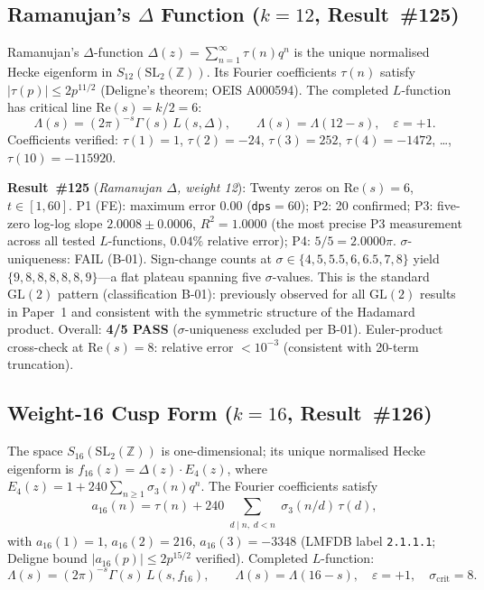 \documentclass[11pt, a4paper]{article}
\theoremstyle{plain}
\theoremstyle{definition}
\begin{document}
\subsection{Ramanujan's $\Delta$ Function ($k=12$, Result~\#125)}
\label{ssec:delta12}

Ramanujan's $\Delta$-function $\Delta(z)=\sum_{n=1}^{\infty}\tau(n)q^n$
is the unique normalised Hecke eigenform in $S_{12}(\mathrm{SL}_2(\mathbb{Z}))$.
Its Fourier coefficients $\tau(n)$ satisfy $|\tau(p)|\leq 2p^{11/2}$
(Deligne's theorem; OEIS A000594).  The completed $L$-function has critical
line $\mathrm{Re}(s)=k/2=6$:
\[
  \Lambda(s) = (2\pi)^{-s}\Gamma(s)\,L(s,\Delta), \qquad
  \Lambda(s)=\Lambda(12-s), \quad \varepsilon=+1.
\]
Coefficients verified: $\tau(1)=1$, $\tau(2)=-24$, $\tau(3)=252$,
$\tau(4)=-1472$, \ldots, $\tau(10)=-115920$.

\medskip
\noindent\textbf{Result~\#125} (\textit{Ramanujan $\Delta$, weight 12}):
Twenty zeros on $\mathrm{Re}(s)=6$, $t\in[1,60]$.
P1 (FE): maximum error $0.00$ (\texttt{dps}$=60$); P2: 20 confirmed;
P3: five-zero log-log slope $\mathbf{2.0008\pm 0.0006}$, $R^{2}=1.0000$
(the most precise P3 measurement across all tested $L$-functions, $0.04\%$
relative error); P4: $5/5=2.0000\pi$.
$\sigma$-uniqueness: FAIL (B-01).  Sign-change counts at
$\sigma\in\{4,5,5.5,6,6.5,7,8\}$ yield $\{9,8,8,8,8,8,9\}$---a flat
plateau spanning five $\sigma$-values.  This is the standard
$\mathrm{GL}(2)$ pattern (classification B-01): previously observed for
all $\mathrm{GL}(2)$ results in Paper~1 and consistent with the symmetric
structure of the Hadamard product.  Overall: \textbf{4/5 PASS}
($\sigma$-uniqueness excluded per B-01).  Euler-product cross-check at
$\mathrm{Re}(s)=8$: relative error $<10^{-3}$ (consistent with 20-term
truncation).

\subsection{Weight-16 Cusp Form ($k=16$, Result~\#126)}
\label{ssec:w16}

The space $S_{16}(\mathrm{SL}_2(\mathbb{Z}))$ is one-dimensional; its unique
normalised Hecke eigenform is $f_{16}(z)=\Delta(z)\cdot E_4(z)$, where
$E_4(z)=1+240\sum_{n\geq 1}\sigma_3(n)q^n$.  The Fourier coefficients
satisfy
\[
  a_{16}(n)=\tau(n)+240\sum_{\substack{d\mid n,\;d<n}}\sigma_3(n/d)\,\tau(d),
\]
with $a_{16}(1)=1$, $a_{16}(2)=216$, $a_{16}(3)=-3348$
(LMFDB label \texttt{2.1.1.1}; Deligne bound $|a_{16}(p)|\leq 2p^{15/2}$
verified).  Completed $L$-function:
\[
  \Lambda(s)=(2\pi)^{-s}\Gamma(s)\,L(s,f_{16}), \qquad
  \Lambda(s)=\Lambda(16-s), \quad \varepsilon=+1, \quad
  \sigma_{\mathrm{crit}}=8.
\]
\end{document}
